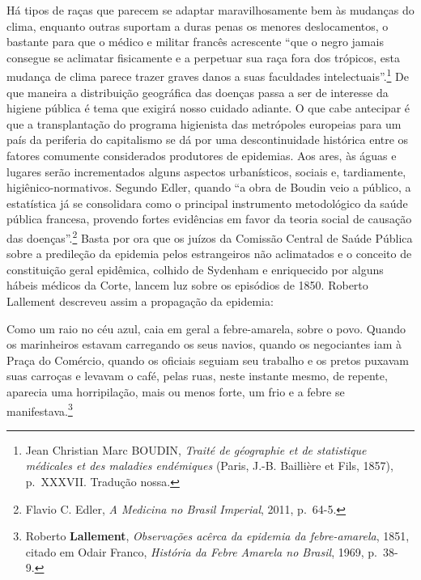 Há tipos de raças que parecem se adaptar maravilhosamente bem às
mudanças do clima, enquanto outras suportam a duras penas os menores
deslocamentos, o bastante para que o médico e militar francês acrescente
``que o negro jamais consegue se aclimatar fisicamente e a perpetuar sua
raça fora dos trópicos, esta mudança de clima parece trazer graves danos
a suas faculdades intelectuais''.\footnote{Jean Christian Marc BOUDIN,
  \emph{Traité de géographie et de statistique médicales et des maladies
  endémiques} (Paris, J.-B. Baillière et Fils, 1857), p.~XXXVII.
  Tradução nossa.} De que maneira a distribuição geográfica das doenças
passa a ser de interesse da higiene pública é tema que exigirá nosso
cuidado adiante. O que cabe antecipar é que a transplantação do programa
higienista das metrópoles europeias para um país da periferia do
capitalismo se dá por uma descontinuidade histórica entre os fatores
comumente considerados produtores de epidemias. Aos ares, às águas e
lugares serão incrementados alguns aspectos urbanísticos, sociais e,
tardiamente, higiênico-normativos. Segundo Edler, quando ``a obra de
Boudin veio a público, a estatística já se consolidara como o principal
instrumento metodológico da saúde pública francesa, provendo fortes
evidências em favor da teoria social de causação das
doenças''.\footnote{Flavio C. Edler, \emph{A Medicina no Brasil
  Imperial}, 2011, p.~64-5.} Basta por ora que os juízos da Comissão
Central de Saúde Pública sobre a predileção da epidemia pelos
estrangeiros não aclimatados e o conceito de constituição geral
epidêmica, colhido de Sydenham e enriquecido por alguns hábeis médicos
da Corte, lancem luz sobre os episódios de 1850. Roberto Lallement
descreveu assim a propagação da epidemia:

Como um raio no céu azul, caia em geral a febre-amarela, sobre o povo.
Quando os marinheiros estavam carregando os seus navios, quando os
negociantes iam à Praça do Comércio, quando os oficiais seguiam seu
trabalho e os pretos puxavam suas carroças e levavam o café, pelas ruas,
neste instante mesmo, de repente, aparecia uma horripilação, mais ou
menos forte, um frio e a febre se manifestava.\footnote{Roberto
  \textbf{Lallement}, \emph{Observações acêrca da epidemia da
  febre-amarela}, 1851, citado em Odair Franco, \emph{História da Febre
  Amarela no Brasil}, 1969, p.~38-9.}

